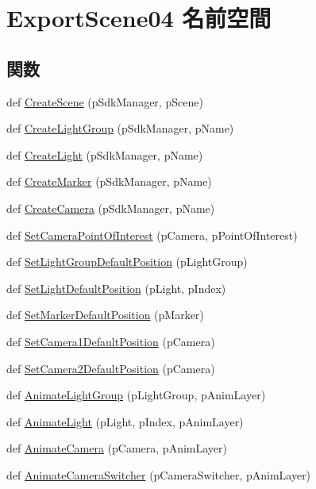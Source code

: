 \hypertarget{namespace_export_scene04}{}\section{Export\+Scene04 名前空間}
\label{namespace_export_scene04}
\subsection*{関数}
\begin{DoxyCompactItemize}
\item 
def \hyperlink{namespace_export_scene04_a7e8f386cc2dcb6e596b141e4b80eff56}{Create\+Scene} (p\+Sdk\+Manager, p\+Scene)
\item 
def \hyperlink{namespace_export_scene04_a962a3371b858479959c4953219f251d2}{Create\+Light\+Group} (p\+Sdk\+Manager, p\+Name)
\item 
def \hyperlink{namespace_export_scene04_ac5e54114e9e956163719747d8cce4328}{Create\+Light} (p\+Sdk\+Manager, p\+Name)
\item 
def \hyperlink{namespace_export_scene04_aac278291c861e4102bf274d489f8ba72}{Create\+Marker} (p\+Sdk\+Manager, p\+Name)
\item 
def \hyperlink{namespace_export_scene04_ad5c23035cb609de3546d7870bd3473a1}{Create\+Camera} (p\+Sdk\+Manager, p\+Name)
\item 
def \hyperlink{namespace_export_scene04_aa262d5875395ca9b58d9cdcef46d173f}{Set\+Camera\+Point\+Of\+Interest} (p\+Camera, p\+Point\+Of\+Interest)
\item 
def \hyperlink{namespace_export_scene04_a743605c74923f1ffaf16c6d6eb51eda9}{Set\+Light\+Group\+Default\+Position} (p\+Light\+Group)
\item 
def \hyperlink{namespace_export_scene04_ad5ffe0c0455e29d7d54020a63ff03b7a}{Set\+Light\+Default\+Position} (p\+Light, p\+Index)
\item 
def \hyperlink{namespace_export_scene04_a6633021b405d1c03aa792da67e193880}{Set\+Marker\+Default\+Position} (p\+Marker)
\item 
def \hyperlink{namespace_export_scene04_aa5d7fbeb3fa506badf67a49806215323}{Set\+Camera1\+Default\+Position} (p\+Camera)
\item 
def \hyperlink{namespace_export_scene04_a40cdcb6aac5872c0498639ab9165809c}{Set\+Camera2\+Default\+Position} (p\+Camera)
\item 
def \hyperlink{namespace_export_scene04_ac899932cc8680a48e3556538129d8e1d}{Animate\+Light\+Group} (p\+Light\+Group, p\+Anim\+Layer)
\item 
def \hyperlink{namespace_export_scene04_a1abb47a8f7578c8bfee5c85daeda8a1e}{Animate\+Light} (p\+Light, p\+Index, p\+Anim\+Layer)
\item 
def \hyperlink{namespace_export_scene04_adccc00cb5bccb0f8f519f6089c62cd42}{Animate\+Camera} (p\+Camera, p\+Anim\+Layer)
\item 
def \hyperlink{namespace_export_scene04_a4813e9ae82c7f9deeb75f0234e0c2112}{Animate\+Camera\+Switcher} (p\+Camera\+Switcher, p\+Anim\+Layer)
\end{DoxyCompactItemize}
